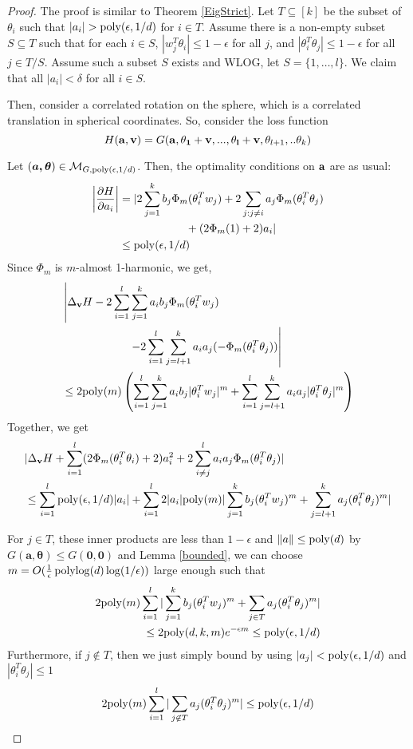\begin{proof}
  The proof is similar to Theorem \ref{EigStrict}. Let $T \subseteq [k]$ be the subset of $\theta_i$ such that $|a_i| > \mathrm{poly}(\epsilon,1/d)$ for $i \in T$. Assume there is a non-empty subset $S \subseteq T$ such that for each $i \in S$, $|w_j^T\theta_i| \leq 1-\epsilon$ for all $j$, and $|\theta_i ^T\theta_j| \leq 1-\epsilon$ for all $j\in T/S$. Assume such a subset $S$ exists and WLOG, let $S = \{1,\dots,l\}$. We claim that all $|a_i| < \delta$ for all $i \in S$. 
  
  Then, consider a correlated rotation on the
  sphere, which is a correlated translation in spherical
  coordinates. So, consider the loss function 
%
\[ H({\bf a, v}) = G({\bf a,\theta_1+v,...,\theta_l+v},\theta_{l+1},..\theta_k)\]

Let $(\boldsymbol{a,\theta}) \in \mathcal{M}_{G, \mathrm{poly}(\epsilon,1/d)}$. Then,
the optimality conditions on ${\bf a}$ are as usual:
%
\begin{align*}
   \left| \frac{\partial H}{\partial a_i} \right| & = \lvert 2\sum_{j=1}^k b_j \Phi_m(\theta_i^T w_j) +
    2\sum_{j: j\neq i} a_j \Phi_m(\theta_i^T\theta_j) \\
& \qquad \qquad \qquad + (2\Phi_m(1) +
    2)a_i \rvert \\
& \leq \mathrm{poly}(\epsilon,1/d)
\end{align*}
%
Since $\Phi_m$ is $m$-almost 1-harmonic, we get,
%
\begin{align*}
  &  \left| \Delta_{{\bf v}} H -  2\sum_{i=1}^l\sum_{j=1}^k a_i b_j
    \Phi_m(\theta_i^Tw_j) \right. \\
& \qquad \qquad \qquad \left.- 2\sum_{i=1}^l\sum_{j= l+1}^k
  a_ia_j(-\Phi_m(\theta_i^T\theta_j)) \right| \\
  & \leq   2\mathrm{poly}(m)\left(\sum_{i=1}^l\sum_{j=1}^k a_i b_j  |\theta_i^Tw_j|^m+\sum_{i=1}^l\sum_{j= l+1}^k a_ia_j|\theta_i^T\theta_j|^m\right)
\end{align*}
%
Together, we get
%
\begin{align*}
& |\Delta_{{\bf v}}H + \sum_{i=1}^l (2\Phi_m(\theta_i^T\theta_i)+2)a_i^2 + 2\sum_{i \neq j}^l a_ia_j\Phi_m(\theta_i^T\theta_j)| \\
& \leq \sum_{i=1}^l\mathrm{poly}(\epsilon,1/d) |a_i| +\sum_{i=1}^l 2|a_i|\mathrm{poly}(m)|\sum_{j=1}^k b_j
  (\theta_i^Tw_j)^m +  \sum_{j=l+1}^k  a_j(\theta_i^T\theta_j)^m|
\\
\end{align*}

For $j\in T$, these inner products are less than
$1-\epsilon$ and $\|a\| \leq \mathrm{poly}(d)$ by
$G(\boldsymbol{a,\theta}) \leq G(\boldsymbol{0,0})$ and Lemma
\ref{bounded}, we can choose
$m = O(\frac{1}{\epsilon}\mathop\mathrm{polylog}\nolimits(d)\log(1/\epsilon))$ large enough such
that
%
\begin{align*}
 2\mathrm{poly}(m)\sum_{i=1}^l|\sum_{j=1}^k b_j (\theta_i^Tw_j)^m +
  \sum_{j \in T}  a_j(\theta_i^T\theta_j)^m| \\
 \leq  2\mathrm{poly}(d,k,m)e^{-\epsilon m} \leq \mathrm{poly}(\epsilon,1/d)
\end{align*}
%
Furthermore, if $j\not \in T$, then we just simply bound by using $|a_j| < \mathrm{poly}(\epsilon,1/d)$ and $|\theta_i^T\theta_j| \leq 1$
\[2\mathrm{poly}(m)\sum_{i=1}^l|
  \sum_{j \not\in T}  a_j(\theta_i^T\theta_j)^m|  \leq \mathrm{poly}(\epsilon,1/d)\]


\end{proof}
